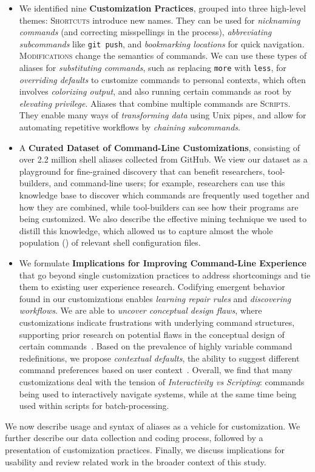 \documentclass[sigconf,nonacm,screen]{acmart}
\newcommand{\per}[1]{\numprint[\%]{#1}}
\newcommand{\cmd}[1]{{\texttt{#1}}}
\begin{document}
\begin{itemize}

	\item We identified nine \textbf{Customization Practices}, grouped into three high-level themes:
	\textsc{Shortcuts} introduce new names.
	They can be used for \emph{nicknaming commands} (and correcting misspellings in the process),
	\emph{abbreviating subcommands} like \texttt{git push},
	and \emph{bookmarking locations} for quick navigation.
	\textsc{Modifications} change the semantics of commands.
	We can use these types of aliases for \emph{substituting commands}, such as replacing \cmd{more} with \cmd{less},
	for \emph{overriding defaults} to customize commands to personal contexts, 
	which often involves \emph{colorizing output},
	and also running certain commands as root by \emph{elevating privilege}.
	Aliases that combine multiple commands are \textsc{Scripts}.
	They enable many ways of \emph{transforming data} using Unix pipes, 
	and allow for automating repetitive workflows by \emph{chaining subcommands}.
	\smallskip
	
	\item A \textbf{Curated Dataset of Command-Line Customizations}, consisting of over 2.2 million shell aliases collected from GitHub.
	We view our dataset as a playground for fine-grained discovery that can benefit researchers, tool-builders, and command-line users;
	for example, researchers can use this knowledge base to discover which commands are frequently used together and how they are combined, while tool-builders can see how their programs are being customized.
We also describe the effective mining technique we used to distill this knowledge, which allowed us to capture almost the whole population (\per{94.09}) of relevant shell configuration files.
	\smallskip	
	
	\item We formulate \textbf{Implications for Improving Command-Line Experience} that go beyond single customization practices to address shortcomings and tie them to existing user experience research.
	Codifying emergent behavior~\citep{fast:14} found in our customizations enables \emph{learning repair rules} and \emph{discovering workflows}.
	We are able to \emph{uncover conceptual design flaws}, where customizations indicate frustrations with underlying command structures, supporting prior research on potential flaws in the conceptual design of certain commands~\citep{perez:13}.
	Based on the prevalence of highly variable command redefinitions, we propose \emph{contextual defaults}, the ability to suggest different command preferences based on user context~\citep{stefanidis:11}.
	Overall, we find that many customizations deal with the tension of \emph{Interactivity vs Scripting}: commands being used to interactively navigate systems, while at the same time being used within scripts for batch-processing.
\end{itemize}
We now describe usage and syntax of aliases as a vehicle for customization. We further describe our data collection and coding process, followed by a presentation of customization practices. Finally, we discuss implications for usability and review related work in the broader context of this study.
\end{document}
